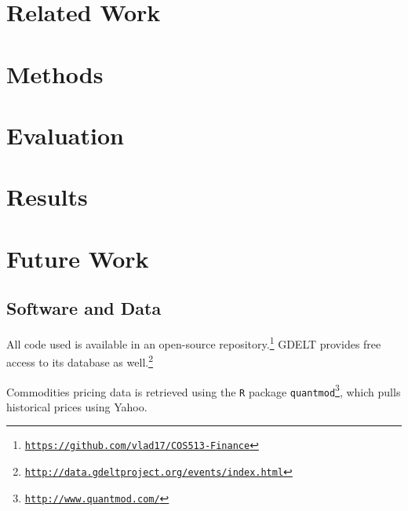 \documentclass{article}
\begin{document}
\section{Related Work}



\section{Methods}



\section{Evaluation}



\section{Results}





\section{Future Work}



\subsection{Software and Data}

All code used is available in an open-source repository.\footnote{\hyperref[https://github.com/vlad17/COS513-Finance]{\texttt{https://github.com/vlad17/COS513-Finance}}} GDELT provides free access to its database as well.\footnote{ \hyperref[http://data.gdeltproject.org/events/index.html]{\texttt{http://data.gdeltproject.org/events/index.html}}}

Commodities pricing data is retrieved using the \texttt{R} package \texttt{quantmod}\footnote{\hyperref[http://www.quantmod.com/]{\texttt{http://www.quantmod.com/}}}, which pulls historical prices using Yahoo.
\end{document}
